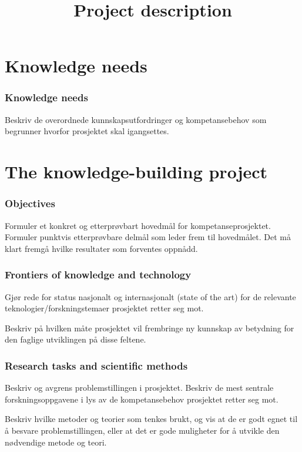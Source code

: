 \documentclass[11pt,a4paper,norsk]{article}
\title{Project description}
\begin{document}
\maketitle

\part{Knowledge needs}

\section{Knowledge needs}
Beskriv de overordnede kunnskapsutfordringer og kompetansebehov som begrunner hvorfor prosjektet skal igangsettes.

\part{The knowledge-building project}

\section{Objectives}
Formuler et konkret og etterprøvbart hovedmål for kompetanseprosjektet.
Formuler punktvis etterprøvbare delmål som leder frem til hovedmålet.
Det må klart fremgå hvilke resultater som forventes oppnådd.

\section{Frontiers of knowledge and technology}
Gjør rede for status nasjonalt og internasjonalt (state of the art) for de relevante teknologier/forskningstemaer prosjektet retter seg mot.

Beskriv på hvilken måte prosjektet vil frembringe ny kunnskap av betydning for den faglige utviklingen på disse feltene.

\section{Research tasks and scientific methods}
Beskriv og avgrens problemstillingen i prosjektet.
Beskriv de mest sentrale forskningsoppgavene i lys av de kompetansebehov prosjektet retter seg mot.

Beskriv hvilke metoder og teorier som tenkes brukt, og vis at de er godt egnet til å besvare problemstillingen, eller at det er gode muligheter for å utvikle den nødvendige metode og teori.
\end{document}
